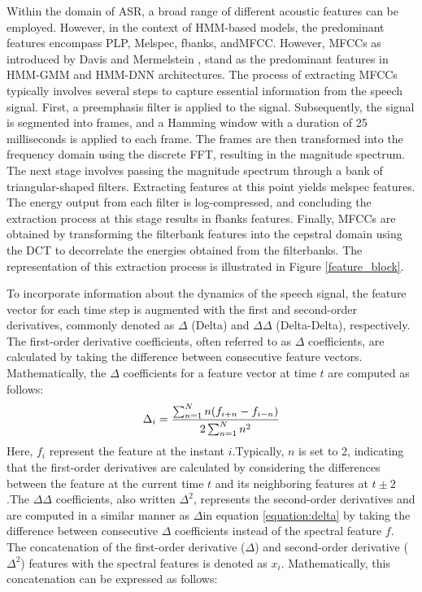 Within the domain of \ac{ASR}, a broad range of different acoustic features can be employed. However, in the context of \ac{HMM}-based models, the predominant features encompass  \ac{PLP}, Melspec, \ac{fbanks}, and\ac{MFCC}. However, \acp{MFCC} as introduced by Davis and Mermelstein \cite{mfcc}, stand as the predominant features in \ac{HMM-GMM} and \ac{HMM-DNN} architectures.
The process of extracting \acp{MFCC} typically involves several steps to capture essential information from the speech signal. First, a preemphasis filter is applied to the signal. Subsequently, the signal is segmented into frames, and a Hamming window with a duration of 25 milliseconds is applied to each frame. The frames are then transformed into the frequency domain using the discrete \ac{FFT}, resulting in the magnitude spectrum.
The next stage involves passing the magnitude spectrum through a bank of triangular-shaped filters. Extracting features at this point yields melspec features. The energy output from each filter is log-compressed, and concluding the extraction process at this stage results in fbanks features. Finally, \acp{MFCC} are obtained by transforming the filterbank features into the cepstral domain using the \ac{DCT} to decorrelate the energies obtained from the filterbanks. The representation of this extraction process is illustrated in Figure \ref{feature_block}.



To incorporate information about the dynamics of the speech signal, the feature vector for each time step is augmented with the first and second-order derivatives, commonly denoted as $\Delta$ (Delta) and $\Delta\Delta$ (Delta-Delta), respectively. The first-order derivative coefficients, often referred to as $\Delta$ coefficients, are calculated by taking the difference between consecutive feature vectors. Mathematically, the $\Delta$ coefficients for a feature vector at time $t$ are computed as follows:
\begin{equation}
 \label{equation:delta}
    \Delta_i = \frac{\sum^{N}_{n=1}n(f_{i+n} - f_{i-n})}{2 \sum^N_{n=1}n^2} \\
\end{equation}
Here, $f_i$ represent the feature at the instant $i$.Typically, $n$ is set to 2, indicating that the first-order derivatives are calculated by considering the differences between the feature at the current time $t$ and its neighboring features at $t \pm 2$.The $\Delta\Delta$ coefficients, also written $\Delta^2$, represents the second-order derivatives and are computed in a similar manner as $\Delta$in equation \ref{equation:delta} by taking the difference between consecutive $\Delta$ coefficients instead of the spectral feature $f$. The concatenation of the first-order derivative ($\Delta$) and second-order derivative ($\Delta^2$) features with the spectral features is denoted as $x_i$. Mathematically, this concatenation can be expressed as follows:

